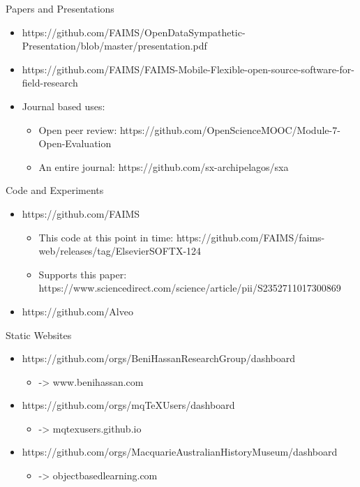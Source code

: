 \documentclass[aspectratio=1610]{beamer} %
\begin{document}
\begin{frame}{Papers and Presentations}
  
    \begin{itemize}
    \item https://github.com/FAIMS/OpenDataSympathetic-Presentation/blob/master/presentation.pdf
    \item https://github.com/FAIMS/FAIMS-Mobile-Flexible-open-source-software-for-field-research
    \item Journal based uses:
    \begin{itemize}
      \item Open peer review: https://github.com/OpenScienceMOOC/Module-7-Open-Evaluation
      \item An entire journal: https://github.com/sx-archipelagos/sxa
    \end{itemize}
  \end{itemize}
\end{frame}

\begin{frame}{Code and Experiments}
  
  \begin{itemize}
    \item https://github.com/FAIMS
    \begin{itemize}  
      \item This code at this point in time: https://github.com/FAIMS/faims-web/releases/tag/ElsevierSOFTX-124 
      \item Supports this paper: https://www.sciencedirect.com/science/article/pii/S2352711017300869
    \end{itemize}    
    \item https://github.com/Alveo
  \end{itemize}
\end{frame}

\begin{frame}{Static Websites}
  
  \begin{itemize}
    \item https://github.com/orgs/BeniHassanResearchGroup/dashboard 
    \begin{itemize}
      \item -> www.benihassan.com
    \end{itemize}
    \item https://github.com/orgs/mqTeXUsers/dashboard 
    \begin{itemize}
      \item -> mqtexusers.github.io
    \end{itemize}
    \item https://github.com/orgs/MacquarieAustralianHistoryMuseum/dashboard 
    \begin{itemize}
      \item -> objectbasedlearning.com
    \end{itemize}
  \end{itemize}
\end{frame}
\end{document}
